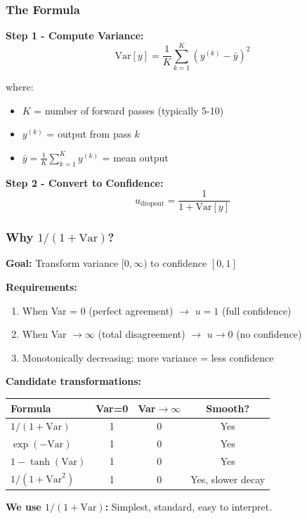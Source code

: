 \documentclass[12pt,a4paper]{article}
\theoremstyle{definition}
\begin{document}
\subsubsection{The Formula}

\textbf{Step 1 - Compute Variance:}
\begin{equation}
\text{Var}[y] = \frac{1}{K} \sum_{k=1}^K (y^{(k)} - \bar{y})^2
\end{equation}

where:
\begin{itemize}
    \item $K$ = number of forward passes (typically 5-10)
    \item $y^{(k)}$ = output from pass $k$
    \item $\bar{y} = \frac{1}{K}\sum_{k=1}^K y^{(k)}$ = mean output
\end{itemize}

\textbf{Step 2 - Convert to Confidence:}
\begin{equation}
u_{\text{dropout}} = \frac{1}{1 + \text{Var}[y]}
\end{equation}

\subsubsection{Why $1/(1+\text{Var})$?}

\begin{whybox}
\textbf{Goal:} Transform variance $[0, \infty)$ to confidence $[0, 1]$

\textbf{Requirements:}
\begin{enumerate}
    \item When Var = 0 (perfect agreement) $\rightarrow$ $u = 1$ (full confidence)
    \item When Var $\rightarrow \infty$ (total disagreement) $\rightarrow$ $u \rightarrow 0$ (no confidence)
    \item Monotonically decreasing: more variance = less confidence
\end{enumerate}

\textbf{Candidate transformations:}

\begin{table}[h]
\centering
\begin{tabular}{lccc}
\toprule
\textbf{Formula} & \textbf{Var=0} & \textbf{Var$\rightarrow\infty$} & \textbf{Smooth?} \\
\midrule
$1/(1+\text{Var})$ & 1 & 0 & Yes \\
$\exp(-\text{Var})$ & 1 & 0 & Yes \\
$1-\tanh(\text{Var})$ & 1 & 0 & Yes \\
$1/(1+\text{Var}^2)$ & 1 & 0 & Yes, slower decay \\
\bottomrule
\end{tabular}
\end{table}

\textbf{We use $1/(1+\text{Var})$:} Simplest, standard, easy to interpret.
\end{whybox}
\end{document}
